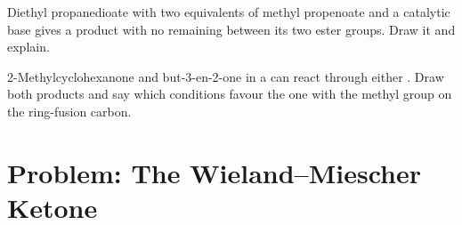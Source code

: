 \begin{exercise}[$\star\star\star$]\label{exo:b2:conjugate-additions:11}
Diethyl propanedioate with two equivalents of methyl propenoate and a catalytic base gives a product
with no remaining  between its two ester groups. Draw it and explain.
\end{exercise}

\begin{exercise}[$\star\star\star$]\label{exo:b2:conjugate-additions:12}
2-Methylcyclohexanone and but-3-en-2-one in a  can react through either .
Draw both products and say which conditions favour the one with the methyl group on the ring-fusion
carbon.
\end{exercise}

\section{Problem: The Wieland--Miescher Ketone}

